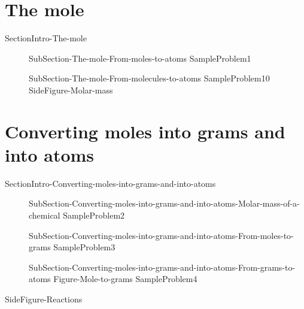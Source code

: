 \documentclass[main.tex]{subfiles}
\begin{document}
\section{The mole}{SectionIntro-The-mole}
\sloppy \begin{description}
\item[] {SubSection-The-mole-From-moles-to-atoms}
\hspace{-3cm}{Figure-The-mole}
{SampleProblem1}
\item[] {SubSection-The-mole-From-molecules-to-atoms}
{SampleProblem10}
{SideFigure-Molar-mass}
\end{description}
	



\section{Converting moles into grams and into atoms}{SectionIntro-Converting-moles-into-grams-and-into-atoms}
\sloppy \begin{description}
\item[] {SubSection-Converting-moles-into-grams-and-into-atoms-Molar-mass-of-a-chemical}
{SampleProblem2}
 \hspace{0cm}{Figure-Mole-equivalency}

\item[] {SubSection-Converting-moles-into-grams-and-into-atoms-From-moles-to-grams}
{SampleProblem3}
\item[] {SubSection-Converting-moles-into-grams-and-into-atoms-From-grams-to-atoms}
{Figure-Mole-to-grams}
{SampleProblem4}
\end{description}




 {SideFigure-Reactions}
\end{document}
